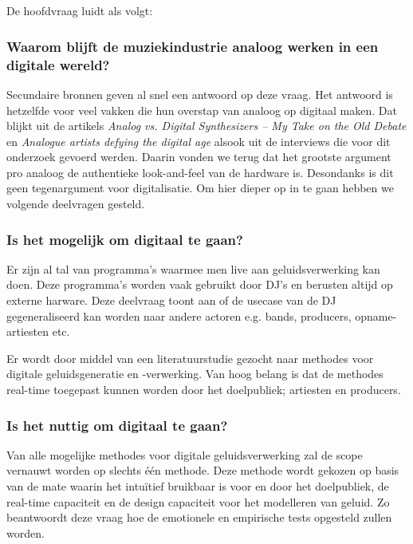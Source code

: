 \section{}
\label{sec:onderzoeksvragen}

De hoofdvraag luidt als volgt:

\subsubsection{Waarom blijft de muziekindustrie analoog werken in een digitale wereld?}

Secundaire bronnen geven al snel een antwoord op deze vraag. Het antwoord is hetzelfde voor veel vakken die hun overstap van analoog op digitaal maken. Dat blijkt uit de artikels \textit{Analog vs. Digital Synthesizers – My Take on the Old Debate} \autocite{juliusdobos} en \textit{Analogue artists defying the digital age} \autocite{GuardianOpinion} alsook uit de interviews die voor dit onderzoek gevoerd werden. Daarin vonden we terug dat het grootste argument pro analoog de authentieke look-and-feel van de hardware is. Desondanks is dit geen tegenargument voor digitalisatie. Om hier dieper op in te gaan hebben we volgende deelvragen gesteld.

\subsubsection{Is het mogelijk om digitaal te gaan?}

Er zijn al tal van programma's waarmee men live aan geluidsverwerking kan doen. Deze programma's worden vaak gebruikt door DJ's en berusten altijd op externe harware. Deze deelvraag toont aan of de usecase van de DJ gegeneraliseerd kan worden naar andere actoren e.g. bands, producers, opname-artiesten etc.

Er wordt door middel van een literatuurstudie gezocht naar methodes voor digitale geluidsgeneratie en -verwerking. Van hoog belang is dat de methodes real-time toegepast kunnen worden door het doelpubliek; artiesten en producers.

\subsubsection{Is het nuttig om digitaal te gaan?}

Van alle mogelijke methodes voor digitale geluidsverwerking zal de scope vernauwt worden op slechts één methode. Deze methode wordt gekozen op basis van de mate waarin het intuïtief bruikbaar is voor en door het doelpubliek, de real-time capaciteit en de design capaciteit voor het modelleren van geluid.
Zo beantwoordt deze vraag hoe de emotionele en empirische tests opgesteld zullen worden.

